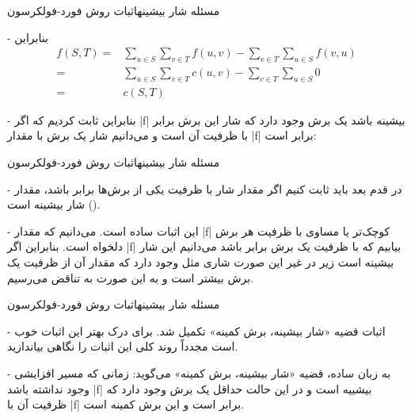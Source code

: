 \begin{itemframe}{مسئله شار بیشینه}{اثبات روش فورد-فولکرسون}
\item[-]
بنابراین
\begin{align*}
f(S, T) = & \sum_{u \in S} \sum_{v \in T} f(u, v) - \sum_{v \in T} \sum_{u \in S} f(v, u)\\
= & \sum_{u \in S} \sum_{v \in T} c(u, v) - \sum_{v \in T} \sum_{u \in S} 0\\
= & c(S, T)
\end{align*}
\item[-]
بنابراین ثابت کردیم که اگر |f| بیشینه باشد یک برش وجود دارد که شار این برش برابر با ظرفیت آن است و می‌دانیم شار یک برش با مقدار |f| برابر است:

\end{itemframe}
\begin{itemframe}{مسئله شار بیشینه}{اثبات روش فورد-فولکرسون}
\item[-]
در قدم بعد باید ثابت کنیم اگر مقدار شار با ظرفیت یکی از برش‌ها برابر باشد، مقدار شار بیشینه است ().
\item[-]
این اثبات ساده است. می‌دانیم که مقدار |f| کوچک‌تر یا مساوی با ظرفیت هر برش دلخواه است. بنابراین اگر |f| بیابیم که با ظرفیت یک برش برابر باشد می‌دانیم این شار بیشینه است زیر در غیر این صورت شاری مثل
وجود دارد که مقدار آن از ظرفیت یک برش بیشتر است و به این صورت به تناقض می‌رسیم.

\end{itemframe}
\begin{itemframe}{مسئله شار بیشینه}{اثبات روش فورد-فولکرسون}
\item[-]
اثبات قضیه «شار بیشینه، برش کمینه» تکمیل شد. برای درک بهتر این اثبات خوب است مجدداً روند کلی این اثبات را نگاهی بیاندازید.
\item[-]
به زبان ساده، قضیه «شار بیشینه، برش کمینه» می‌گوید: زمانی که مسیر افزایشی وجود نداشته باشد |f| بیشییه است و در این حالت حداقل یک برش وجود دارد که ظرفیت آن با |f| برابر است و این برش کمینه است.
\end{itemframe}